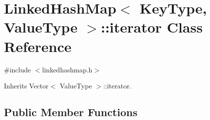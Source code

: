 \hypertarget{classLinkedHashMap_1_1iterator}{}\section{Linked\+Hash\+Map$<$ Key\+Type, Value\+Type $>$\+:\+:iterator Class Reference}
\label{classLinkedHashMap_1_1iterator}


{\ttfamily \#include $<$linkedhashmap.\+h$>$}



Inherits Vector$<$ Value\+Type $>$\+::iterator.

\subsection*{Public Member Functions}
